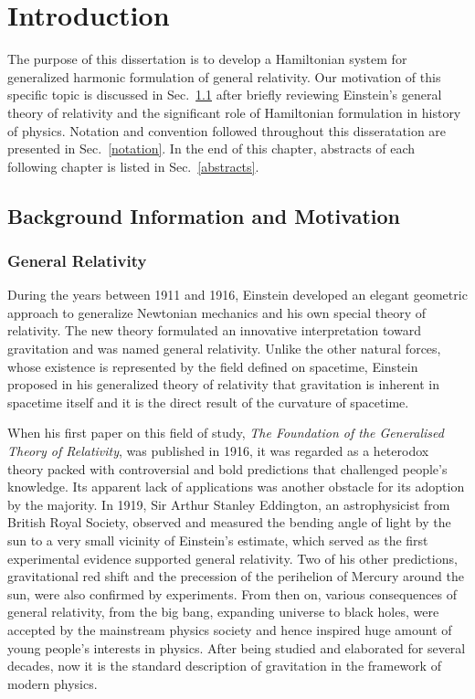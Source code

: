 \chapter{Introduction}\label{introduction}
The purpose of this dissertation is to develop a Hamiltonian system for generalized harmonic formulation of general relativity. Our motivation of this specific topic is discussed in Sec.~\ref{background} after briefly reviewing Einstein's general theory of relativity and the significant role of Hamiltonian formulation in history of physics. Notation and convention followed throughout this disseratation are presented in Sec.~\ref{notation}. In the end of this chapter, abstracts of each following chapter is listed in Sec.~\ref{abstracts}.
\section{Background Information and Motivation}\label{background}
\subsection{General Relativity}\label{gr}
During the years between 1911 and 1916, Einstein developed an elegant geometric approach to generalize Newtonian mechanics and his own special theory of relativity. The new theory formulated an innovative interpretation toward gravitation and was named general relativity. Unlike the other natural forces, whose existence is represented by the field defined on spacetime, Einstein proposed in his generalized theory of relativity that gravitation is inherent in spacetime itself and it is the direct result of the curvature of spacetime\cite[pp. 1]{carroll2003spacetime}.

When his first paper on this field of study, {\it The Foundation of the Generalised Theory of Relativity}, was published in 1916, it was regarded as a heterodox theory packed with controversial and bold predictions that challenged people's knowledge. Its apparent lack of applications was another obstacle for its adoption by the majority. In 1919, Sir Arthur Stanley Eddington, an astrophysicist from British Royal Society, observed and measured the bending angle of light by the sun to a very small vicinity of Einstein's estimate, which served as the first experimental evidence supported general relativity. Two of his other predictions, gravitational red shift and the precession of the perihelion of Mercury around the sun, were also confirmed by experiments. From then on, various consequences of general relativity, from the big bang, expanding universe to black holes, were accepted by the mainstream physics society and hence inspired huge amount of young people's interests in physics. After being studied and elaborated for several decades, now it is the standard description of gravitation in the framework of modern physics. 


